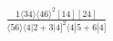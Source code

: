 \documentclass[varwidth, border=5pt]{standalone}
\begin{document}
\begin{my}
$\begin{gathered}
\scriptscriptstyle\frac{1⟨34⟩⟨46⟩^2[14][24]}{⟨56⟩⟨4|2+3|4]^2⟨4|5+6|4]}
\end{gathered}$
\end{my}
\end{document}
